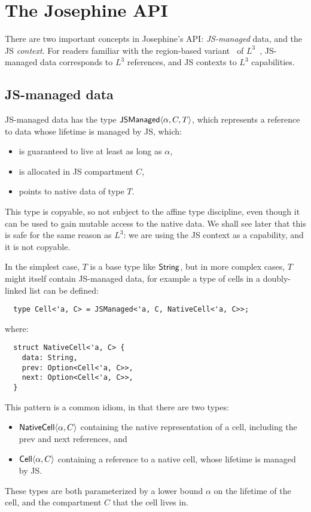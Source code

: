\section{The Josephine API}

There are two important concepts in Josephine's API: \emph{JS-managed} data,
and the JS \emph{context}. For readers familiar with the region-based
variant~\cite{l3-with-regions} of $L^3$~\cite{l3}, JS-managed data
corresponds to $L^3$ references, and JS contexts to $L^3$ capabilities.

\subsection{JS-managed data}

JS-managed data has the type $\mathsf{JSManaged}\langle \alpha, C, T\rangle$, which represents
a reference to data whose lifetime is managed by JS, which:
\begin{itemize}

\item is guaranteed to live at least as long as $\alpha$,
\item is allocated in JS compartment $C$,
\item points to native data of type $T$.
  
\end{itemize}
This type is copyable, so not subject to the affine type discipline,
even though it can be used to gain mutable access to the native
data. We shall see later that this is safe for the same reason as
$L^3$: we are using the JS context as a capability, and it is not
copyable.

In the simplest case, $T$ is a base type like $\mathsf{String}$, but in more complex
cases, $T$ might itself contain JS-managed data, for example a type of
cells in a doubly-linked list can be defined:
\begin{verbatim}
  type Cell<'a, C> = JSManaged<'a, C, NativeCell<'a, C>>;
\end{verbatim}
where:
\begin{verbatim}
  struct NativeCell<'a, C> {
    data: String,
    prev: Option<Cell<'a, C>>,
    next: Option<Cell<'a, C>>,
  }
\end{verbatim}
This pattern is a common idiom, in that there are two types:
\begin{itemize}
\item $\mathsf{NativeCell}\langle \alpha,C\rangle$ containing the native representation
of a cell, including the prev and next
references, and
\item $\mathsf{Cell}\langle \alpha,C\rangle$ containing a reference to a native cell,
whose lifetime is managed by JS.
\end{itemize}
These types are both parameterized by a lower bound $\alpha$ on the lifetime
of the cell, and the compartment $C$ that the cell lives in.

